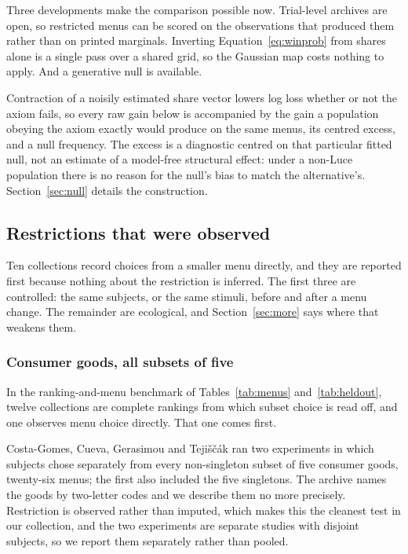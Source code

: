 \documentclass[11pt]{article}
\begin{document}
Three developments make the comparison possible now. Trial-level archives are open, so restricted menus can be
scored on the observations that produced them rather than on printed marginals. Inverting
Equation~\eqref{eq:winprob} from shares alone is a single pass over a shared grid, so the
Gaussian map costs nothing to apply. And a generative null is available.

Contraction of a noisily
estimated share vector lowers log loss whether or not the axiom fails, so every raw gain below is
accompanied by the gain a population obeying the axiom exactly would produce on the same menus,
its centred excess, and a null frequency. The excess is a diagnostic centred on that particular
fitted null, not an estimate of a model-free structural effect: under a non-Luce population there
is no reason for the null's bias to match the alternative's. Section~\ref{sec:null} details the
construction.

\subsection{Restrictions that were observed}
\label{sec:observed}

Ten collections record choices from a smaller menu directly, and they are reported first because
nothing about the restriction is inferred. The first three are controlled: the same subjects, or
the same stimuli, before and after a menu change. The remainder are ecological, and
Section~\ref{sec:more} says where that weakens them.

\subsubsection{Consumer goods, all subsets of five}
\label{sec:menus}

In the ranking-and-menu benchmark of Tables~\ref{tab:menus} and~\ref{tab:heldout}, twelve
collections are complete rankings from which subset choice is read off, and one observes menu
choice directly. That one comes first.

Costa-Gomes, Cueva, Gerasimou and Teji\v{s}\v{c}\'ak \cite{costagomes2022} ran two
experiments in which subjects chose separately from every non-singleton subset of five
consumer goods, twenty-six menus; the first also included the five singletons. The archive
names the goods by two-letter codes and we describe them no more precisely. Restriction is
observed rather than imputed, which makes this the cleanest test in our collection, and the
two experiments are separate studies with disjoint subjects, so we report them separately
rather than pooled.
\end{document}
